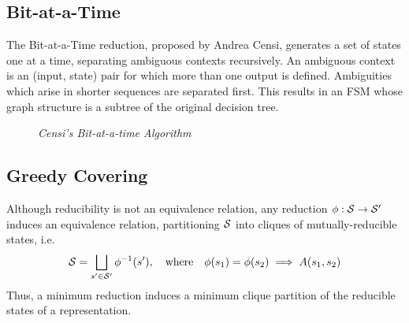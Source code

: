 \subsection{Bit-at-a-Time}
The Bit-at-a-Time reduction, proposed by Andrea Censi, generates a set of states one at a time,
separating ambiguous contexts recursively.  An ambiguous context is an (input, state) pair for
which more than one output is defined.  Ambiguities which arise in shorter sequences are separated first.
This results in an FSM whose graph structure is a subtree of the original decision tree.
\begin{figure}
\centering
{}
\caption{\emph{Censi's Bit-at-a-time Algorithm}}
\end{figure}
 
\subsection{Greedy Covering}

Although reducibility is not an equivalence relation, 
any reduction $\phi:\S\to\S\1$ induces an equivalence relation,
partitioning $\S$ into cliques of mutually-reducible states, i.e.
\begin{equation}
\S = \bigsqcup_{s\1\in\S\1}\phi\inv(s\1),\qtx{where}\phi(s_1)=\phi(s_2)\implies A(s_1,s_2)
\end{equation}
Thus, a minimum 
reduction
induces a minimum clique partition of the
reducible states of a representation.

